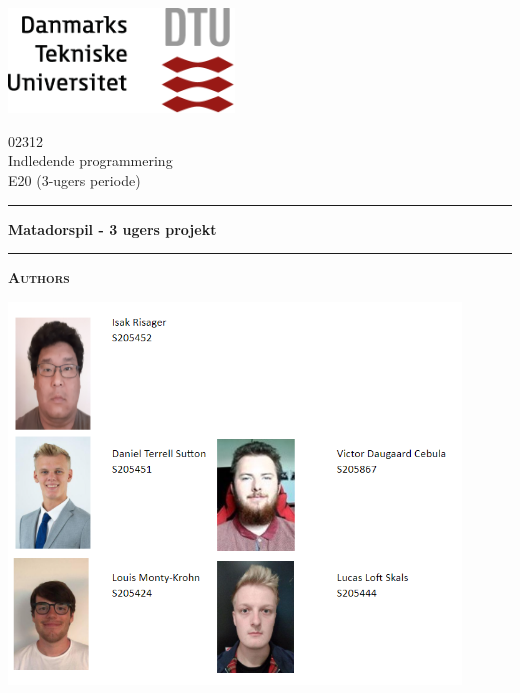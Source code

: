 \begin{titlepage}
\begin{center}
\begin{multicols}{2}
\addtolength{\topmargin}{-.5cm}

\includegraphics[width=0.45\textwidth]{root/dtu.png}~\\
\vspace{.5cm}



02312\\ 
\vspace{.5 cm}
Indledende programmering \\
\vspace{.5 cm}
E20 (3-ugers periode) \\
\end{multicols}{}
\vspace{.5cm}

\hrule
\vspace{.5cm}
{ \huge \bfseries  Matadorspil - 3 ugers projekt} %
\vspace{.5cm}

\hrule
\vspace{1cm}

\textsc{\textbf{Authors}}\\

\begin{center}

\includegraphics[width=0.9\textwidth]{Report/root/Forside.png}\\


\end{center}
\end{center}
\end{titlepage}

